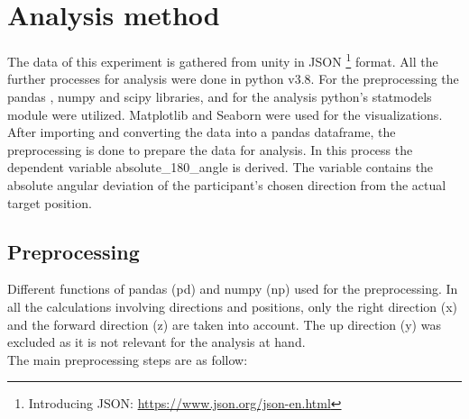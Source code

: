 \section{Analysis method}

The data of this experiment is gathered from unity in JSON \footnote{Introducing JSON: \href{https://www.json.org/json-en.html}{https://www.json.org/json-en.html}} format. All the further processes for analysis were done in python \autocite{10.5555/1593511} v3.8. For the preprocessing the pandas \autocite{reback2022pandas, mckinney-proc-scipy-2010}, numpy \autocite{harris2020array} and scipy \autocite{2020SciPy-NMeth} libraries, and for the analysis python's statmodels \autocite{seabold2010statsmodels} module were utilized. Matplotlib \autocite{Hunter:2007} and Seaborn \autocite{Waskom2021} were used for the visualizations.\\

After importing and converting the data into a pandas dataframe, the preprocessing is done to prepare the data for analysis. In this process the dependent variable {\emphasize absolute\_180\_angle} is derived. The variable contains the absolute angular deviation of the participant's chosen direction from the actual target position. 

\subsection{Preprocessing}

Different functions of pandas {\emphasize (pd)} and numpy {\emphasize (np)} used for the preprocessing. In all the calculations involving directions and positions, only the right direction (x) and the forward direction (z) are taken into account. The up direction (y) was excluded as it is not relevant for the analysis at hand. \\

The main preprocessing steps are as follow:

